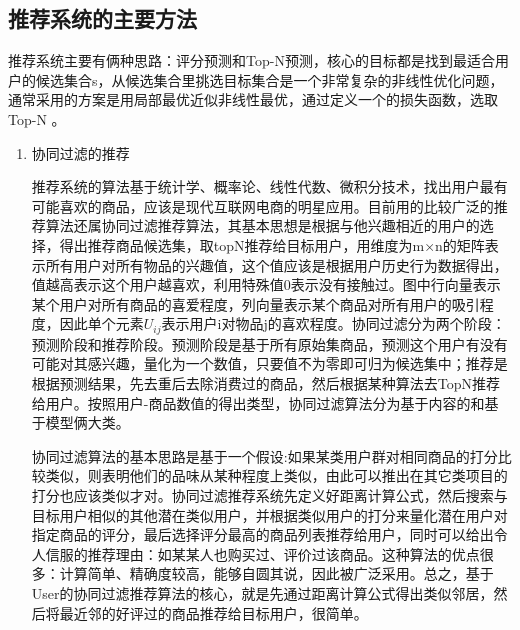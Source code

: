 		\subsection{推荐系统的主要方法}
		推荐系统主要有俩种思路：评分预测和Top-N预测，核心的目标都是找到最适合用户的候选集合s，从候选集合里挑选目标集合是一个非常复杂的非线性优化问题，通常采用的方案是用局部最优近似非线性最优，通过定义一个的损失函数，选取Top-N	\citep{recmd-Next}。
		\begin{enumerate}[(1)]
		\item 协同过滤的推荐

		推荐系统的算法基于统计学、概率论、线性代数、微积分技术，找出用户最有可能喜欢的商品，应该是现代互联网电商的明星应用。目前用的比较广泛的推荐算法还属协同过滤推荐算法，其基本思想是根据与他兴趣相近的用户的选择，得出推荐商品候选集，取topN推荐给目标用户，用维度为m×n的矩阵表示所有用户对所有物品的兴趣值，这个值应该是根据用户历史行为数据得出，值越高表示这个用户越喜欢，利用特殊值0表示没有接触过。图中行向量表示某个用户对所有商品的喜爱程度，列向量表示某个商品对所有用户的吸引程度，因此单个元素$U_{ij}$表示用户i对物品j的喜欢程度。协同过滤分为两个阶段：预测阶段和推荐阶段。预测阶段是基于所有原始集商品，预测这个用户有没有可能对其感兴趣，量化为一个数值，只要值不为零即可归为候选集中；推荐是根据预测结果，先去重后去除消费过的商品，然后根据某种算法去TopN推荐给用户。按照用户-商品数值的得出类型，协同过滤算法分为基于内容的和基于模型俩大类\citep{Wikipedia}。

		协同过滤算法的基本思路是基于一个假设:如果某类用户群对相同商品的打分比较类似，则表明他们的品味从某种程度上类似，由此可以推出在其它类项目的打分也应该类似才对。协同过滤推荐系统先定义好距离计算公式，然后搜索与目标用户相似的其他潜在类似用户，并根据类似用户的打分来量化潜在用户对指定商品的评分，最后选择评分最高的商品列表推荐给用户，同时可以给出令人信服的推荐理由：如某某人也购买过、评价过该商品。这种算法的优点很多：计算简单、精确度较高，能够自圆其说，因此被广泛采用。总之，基于User的协同过滤推荐算法的核心，就是先通过距离计算公式得出类似邻居，然后将最近邻的好评过的商品推荐给目标用户，很简单。


\end{enumerate}

